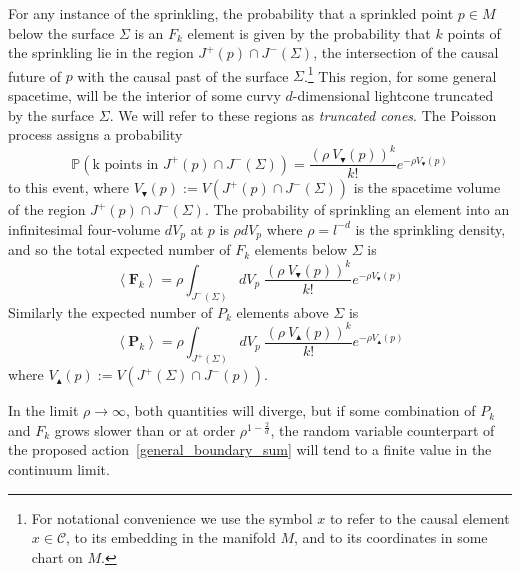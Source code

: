 \documentclass[12pt]{article}
\newcommand{\be}{\begin{equation}}
\newcommand{\ee}{\end{equation}}
\newcommand{\F}[1]{F_{#1}}
\renewcommand{\P}[1]{P_{#1}}
\newcommand{\BF}[1]{\mathbf{F}_{#1}}
\newcommand{\BP}[1]{\mathbf{P}_{#1}}
\begin{document}
For any instance of the sprinkling, the probability that a sprinkled point $p\in M$ below the surface $\Sigma$ is an $F_k$ element is given by the probability that $k$ points of the sprinkling lie in the region $J^{+} (p)\cap J^{-} (\Sigma)$, the intersection of the causal future of $p$ with the causal past of the surface $\Sigma$.\footnote{For notational convenience we use the symbol $x$ to refer to the causal element $x\in\mathcal C$, to its embedding in the manifold $M$, and to its coordinates in some chart on $M$.} This region, for some general spacetime, will be the interior of some curvy $d$-dimensional lightcone truncated by the surface $\Sigma$. We will refer to these regions as \emph{truncated cones}. The Poisson process assigns a probability
\be\label{Poisson}
\mathbb P\left (\text{k points in }J^{+} (p)\cap J^{-} (\Sigma)\right)=\frac{\left (\rho\: V_\blacktriangledown (p)\right)^k}{k!}e^{-\rho V_\blacktriangledown (p)}
\ee
to this event, where $V_\blacktriangledown (p):= V (J^{+} (p)\cap J^{-} (\Sigma))$ is the spacetime volume of the region $J^{+} (p)\cap J^{-} (\Sigma)$. The probability of sprinkling an element into an infinitesimal four-volume $dV_p$ at $p$ is $\rho dV_p$ where $\rho=l^{-d}$ is the sprinkling density, and so the total expected number of $\F{k}$ elements below $\Sigma$ is
\be\label{eq:nmax}
\left\langle \BF{k}\right\rangle =\rho\int_{J^{-} (\Sigma)}dV_p\; \frac{\left (\rho\: V_\blacktriangledown (p)\right)^k}{k!}e^{-\rho V_\blacktriangledown (p)}
\ee
Similarly the expected number of $\P{k}$ elements above $\Sigma$ is
\be\label{eq:nmin}
\left\langle \BP{k}\right\rangle =\rho\int_{J^{+} (\Sigma)}dV_p\; \frac{\left (\rho\: V_\blacktriangle (p)\right)^k}{k!}e^{-\rho V_\blacktriangle (p)}
\ee
where $V_\blacktriangle (p):= V (J^{+} (\Sigma)\cap J^{-} (p))$.

In the limit $\rho\rightarrow\infty$, both quantities will diverge, but if some combination of $\P{k}$ and $\F{k}$ grows slower than or at order $\rho^{1-\frac2d}$, the random variable counterpart of the proposed action~\eqref{general_boundary_sum} will tend to a finite value in the continuum limit.
\end{document}
